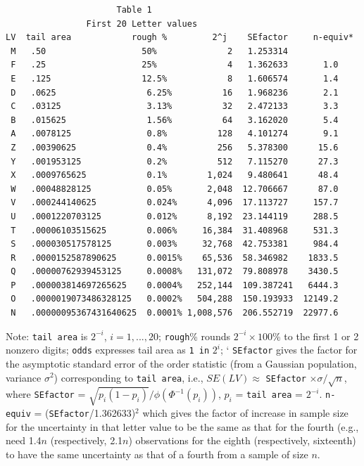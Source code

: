 \documentclass[oneside]{article}
\begin{document}
\begin{verbatim}
                      Table 1
                First 20 Letter values 
LV  tail area            rough %         2^j    SEfactor     n-equiv*
 M   .50                   50%              2   1.253314 
 F   .25                   25%              4   1.362633       1.0
 E   .125                  12.5%            8   1.606574       1.4
 D   .0625                  6.25%          16   1.968236       2.1
 C   .03125                 3.13%          32   2.472133       3.3
 B   .015625                1.56%          64   3.162020       5.4
 A   .0078125               0.8%          128   4.101274       9.1
 Z   .00390625              0.4%          256   5.378300      15.6
 Y   .001953125             0.2%          512   7.115270      27.3
 X   .0009765625            0.1%        1,024   9.480641      48.4
 W   .00048828125           0.05%       2,048  12.706667      87.0  
 V   .000244140625          0.024%      4,096  17.113727     157.7
 U   .0001220703125         0.012%      8,192  23.144119     288.5
 T   .00006103515625        0.006%     16,384  31.408968     531.3
 S   .000030517578125       0.003%     32,768  42.753381     984.4
 R   .0000152587890625      0.0015%    65,536  58.346982    1833.5
 Q   .00000762939453125     0.0008%   131,072  79.808978    3430.5
 P   .000003814697265625    0.0004%   252,144  109.387241   6444.3
 O   .0000019073486328125   0.0002%   504,288  150.193933  12149.2
 N   .00000095367431640625  0.0001% 1,008,576  206.552719  22977.6
\end{verbatim}

Note: \texttt{tail area} is $2 ^{-i}$, $i = 1, ..., 20$; 
\texttt{rough}\% rounds $2 ^{-i} \times 100$\%
   to the first 1 or 2 nonzero digits; 
\texttt{odds} expresses tail area as \texttt{1 in} $2^i$; `
\texttt{SEfactor} gives the factor for the asymptotic standard error
of the order statistic (from a Gaussian population, variance $\sigma^2$) 
corresponding to \texttt{tail area}, i.e., 
  $SE(LV) \approx$ \texttt{SEfactor} $\times \sigma / \sqrt{n}$,
where \texttt{SEfactor} = $\sqrt{p_i (1-p_i)} / \phi(\Phi^{-1}(p_i))$,
$p_i$ = \texttt{tail area} = $2^{-i}$.
\texttt{n-equiv} = (\texttt{SEfactor}/1.362633)$^2$ which gives
the factor of increase in sample size for the uncertainty in
that letter value to be the same as that for the fourth
(e.g., need 1.4$n$ (respectively, 2.1$n$) observations for the 
eighth (respectively, sixteenth) to have 
the same uncertainty as that of a fourth from a sample of size $n$.
\end{document}
